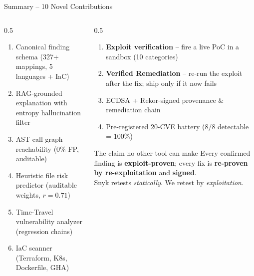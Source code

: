 \documentclass[aspectratio=169,12pt]{beamer}
\newcommand{\good}[1]{\textbf{\color{acrGreen}#1}}
\begin{document}
\begin{frame}{Summary -- 10 Novel Contributions}
  \begin{columns}[T]
    \begin{column}{0.5\textwidth}
      \begin{enumerate}\small
        \item Canonical finding schema (327+ mappings, 5 languages + IaC)
        \item RAG-grounded explanation with entropy hallucination filter
        \item AST call-graph reachability (0\% FP, auditable)
        \item Heuristic file risk predictor (auditable weights, $r=0.71$)
        \item Time-Travel vulnerability analyzer (regression chains)
        \item IaC scanner (Terraform, K8s, Dockerfile, GHA)
      \end{enumerate}
    \end{column}
    \begin{column}{0.5\textwidth}
      \begin{enumerate}\small
        \addtocounter{enumi}{6}
        \item \good{Exploit verification} -- fire a live PoC in a sandbox (10 categories)
        \item \good{Verified Remediation} -- re-run the exploit after the fix; ship only if it now fails
        \item ECDSA + Rekor-signed provenance \& remediation chain
        \item Pre-registered 20-CVE battery (8/8 detectable = 100\%)
      \end{enumerate}
      \vspace{6pt}
      \begin{exampleblock}{The claim no other tool can make}
        Every confirmed finding is \textbf{exploit-proven}; every fix is
        \textbf{re-proven by re-exploitation} and \textbf{signed}.\\
        Snyk retests \emph{statically}. We retest by \emph{exploitation}.
      \end{exampleblock}
    \end{column}
  \end{columns}
\end{frame}
\end{document}
